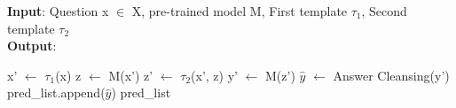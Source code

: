 \begin{algorithm}[t]
\caption{\ours}
\label{alg:algorithm}
\textbf{Input}: 
Question x $\in$ X, pre-trained model M, First template $\tau_1$, Second template $\tau_2$ \\
\textbf{Output}:
\begin{algorithmic}[1]
\STATE x’ $\leftarrow$ $\tau_1$(x)
\STATE z $\leftarrow$ M(x’)
\STATE z’ $\leftarrow$ $\tau_2$(x', z)
\STATE y' $\leftarrow$ M(z’)
\STATE $\hat{y}$ $\leftarrow$ Answer Cleansing(y')
\STATE pred\_list.append($\hat{y}$)
\ENDFOR
\RETURN pred\_list
\end{algorithmic}
\end{algorithm}